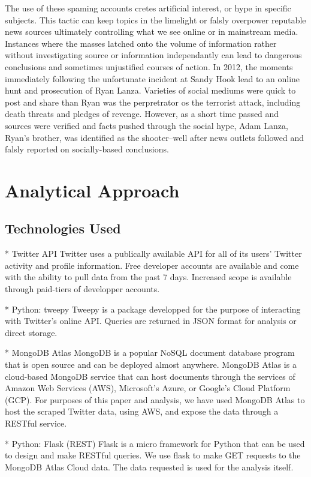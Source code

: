 The use of these spaming accounts cretes artificial interest, or hype in specific subjects. This tactic can keep topics in the limelight or falsly overpower reputable news sources ultimately controlling what we see online or in mainstream media. Instances where the masses latched onto the volume of information rather without investigating source or information independantly can lead to dangerous conclusions and sometimes unjustified courses of action. In 2012, the moments immediately following the unfortunate incident at Sandy Hook lead to an online hunt and prosecution of Ryan Lanza. Varieties of social mediums were quick to post and share than Ryan was the perpretrator os the terrorist attack, including death threats and pledges of revenge. However, as a short time passed and sources were verified and facts pushed through the social hype, Adam Lanza, Ryan's brother, was identified as the shooter--well after news outlets followed and falsly reported on socially-based conclusions.

\section{Analytical Approach}

\subsection{Technologies Used}

 * Twitter API
Twitter uses a publically available API for all of its users' Twitter activity and profile information. Free developer accounts are available and come with the ability to pull data from the past 7 days. Increased scope is available through paid-tiers of developper accounts.

 * Python: tweepy
 Tweepy is a package developped for the purpose of interacting with Twitter's online API. Queries are returned in JSON format for analysis or direct storage.

 * MongoDB Atlas
 MongoDB is a popular NoSQL document database program that is open source and can be deployed almost anywhere. MongoDB Atlas is a cloud-based MongoDB service that can host documents through the services of Amazon Web Services (AWS), Microsoft's Azure, or Google's Cloud Platform (GCP). For purposes of this paper and analysis, we have used MongoDB Atlas to host the scraped Twitter data, using AWS, and expose the data through a RESTful service.

 * Python: Flask (REST)
 Flask is a micro framework for Python that can be used to design and make RESTful queries. We use flask to make GET requests to the MongoDB Atlas Cloud data. The data requested is used for the analysis itself.


